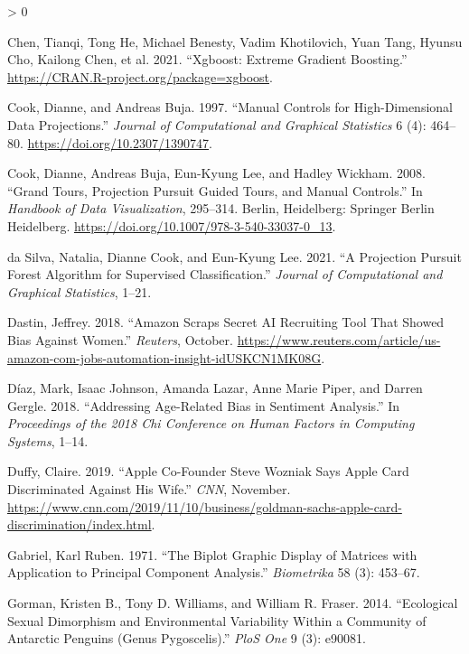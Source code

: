 \documentclass[
]{article}
\newlength{\cslhangindent}
\newenvironment{CSLReferences}[2] %
 {%
  \setlength{\parindent}{0pt}
  \ifodd #1 \everypar{\setlength{\hangindent}{\cslhangindent}}\ignorespaces\fi
  \ifnum #2 > 0
  \setlength{\parskip}{#2\baselineskip}
  \fi
 }%
 {}
\begin{document}
\begin{CSLReferences}{1}{0}
\leavevmode\hypertarget{ref-chen_xgboost_2021}{}%
Chen, Tianqi, Tong He, Michael Benesty, Vadim Khotilovich, Yuan Tang, Hyunsu Cho, Kailong Chen, et al. 2021. {``Xgboost: {Extreme} {Gradient} {Boosting}.''} \url{https://CRAN.R-project.org/package=xgboost}.

\leavevmode\hypertarget{ref-cook_manual_1997}{}%
Cook, Dianne, and Andreas Buja. 1997. {``Manual {Controls} for {High}-{Dimensional} {Data} {Projections}.''} \emph{Journal of Computational and Graphical Statistics} 6 (4): 464--80. \url{https://doi.org/10.2307/1390747}.

\leavevmode\hypertarget{ref-cook_grand_2008}{}%
Cook, Dianne, Andreas Buja, Eun-Kyung Lee, and Hadley Wickham. 2008. {``Grand {Tours}, {Projection} {Pursuit} {Guided} {Tours}, and {Manual} {Controls}.''} In \emph{Handbook of {Data} {Visualization}}, 295--314. Berlin, Heidelberg: Springer Berlin Heidelberg. \url{https://doi.org/10.1007/978-3-540-33037-0_13}.

\leavevmode\hypertarget{ref-da_silva_projection_2021}{}%
da Silva, Natalia, Dianne Cook, and Eun-Kyung Lee. 2021. {``A {Projection} {Pursuit} {Forest} {Algorithm} for {Supervised} {Classification}.''} \emph{Journal of Computational and Graphical Statistics}, 1--21.

\leavevmode\hypertarget{ref-dastin_amazon_2018}{}%
Dastin, Jeffrey. 2018. {``Amazon Scraps Secret {AI} Recruiting Tool That Showed Bias Against Women.''} \emph{Reuters}, October. \url{https://www.reuters.com/article/us-amazon-com-jobs-automation-insight-idUSKCN1MK08G}.

\leavevmode\hypertarget{ref-diaz_addressing_2018}{}%
Díaz, Mark, Isaac Johnson, Amanda Lazar, Anne Marie Piper, and Darren Gergle. 2018. {``Addressing Age-Related Bias in Sentiment Analysis.''} In \emph{Proceedings of the 2018 Chi Conference on Human Factors in Computing Systems}, 1--14.

\leavevmode\hypertarget{ref-duffy_apple_2019}{}%
Duffy, Claire. 2019. {``Apple Co-Founder {Steve} {Wozniak} Says {Apple} {Card} Discriminated Against His Wife.''} \emph{CNN}, November. \url{https://www.cnn.com/2019/11/10/business/goldman-sachs-apple-card-discrimination/index.html}.

\leavevmode\hypertarget{ref-gabriel_biplot_1971}{}%
Gabriel, Karl Ruben. 1971. {``The Biplot Graphic Display of Matrices with Application to Principal Component Analysis.''} \emph{Biometrika} 58 (3): 453--67.

\leavevmode\hypertarget{ref-gorman_ecological_2014}{}%
Gorman, Kristen B., Tony D. Williams, and William R. Fraser. 2014. {``Ecological Sexual Dimorphism and Environmental Variability Within a Community of {Antarctic} Penguins (Genus {Pygoscelis}).''} \emph{PloS One} 9 (3): e90081.


\end{CSLReferences}
\end{document}
